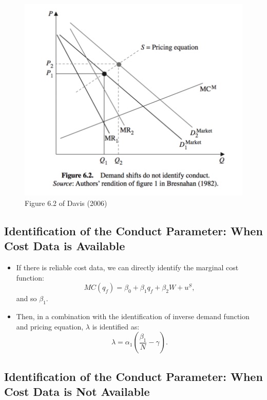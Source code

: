 \documentclass[
]{book}
\providecommand{\tightlist}{%
  \setlength{\itemsep}{0pt}\setlength{\parskip}{0pt}}
\begin{document}
\begin{figure}

{\centering \includegraphics[width=0.8\linewidth]{figuretable/demandshift} 

}

\caption{Figure 6.2 of Davis (2006)}\label{fig:unnamed-chunk-25}
\end{figure}

\hypertarget{identification-of-the-conduct-parameter-when-cost-data-is-available}{%
\subsection{Identification of the Conduct Parameter: When Cost Data is Available}\label{identification-of-the-conduct-parameter-when-cost-data-is-available}}

\begin{itemize}
\tightlist
\item
  If there is reliable cost data, we can directly identify the marginal cost function:
  \begin{equation}
  MC(q_f) = \beta_0 + \beta_1 q_f + \beta_2 W + u^S,
  \end{equation}
  and so \(\beta_1\).
\item
  Then, in a combination with the identification of inverse demand function and pricing equation, \(\lambda\) is identified as:
  \begin{equation}
  \lambda = \alpha_1 \left(\frac{\beta_1}{N} - \gamma\right).
  \end{equation}
\end{itemize}

\hypertarget{identification-of-the-conduct-parameter-when-cost-data-is-not-available}{%
\subsection{Identification of the Conduct Parameter: When Cost Data is Not Available}\label{identification-of-the-conduct-parameter-when-cost-data-is-not-available}}
\end{document}
